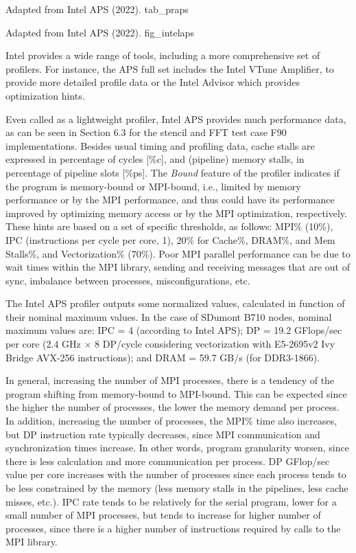     {Adapted from Intel APS (2022).} {tab_praps}

     {Adapted from Intel APS (2022).} {fig_intelaps}

Intel provides a wide range of tools, including a more comprehensive set of profilers. For instance, the APS full set includes the Intel VTune Amplifier, to provide more detailed profile data or the Intel Advisor which provides optimization hints. 

Even called as a lightweight profiler, Intel APS provides much performance data, as can be seen in Section 6.3 for the stencil and FFT test case F90 implementations. Besides usual timing and profiling data, cache stalls are expressed in percentage of cycles [\%c], and (pipeline) memory stalls, in percentage of pipeline slots [\%ps]. The \textit {Bound} feature of the profiler indicates if the program is memory-bound or MPI-bound, i.e., limited by memory performance or by the MPI performance, and thus could have its performance improved by optimizing memory access or by the MPI optimization, respectively. These hints are based on a set of specific thresholds, as follows:  MPI\% (10\%), IPC (instructions per cycle per core, 1), 20\% for Cache\%, DRAM\%, and Mem Stalls\%, and Vectorization\% (70\%). Poor MPI parallel performance can be due to wait times within the MPI library, sending and receiving messages that are out of sync, imbalance between processes, misconfigurations, etc.

The Intel APS profiler outputs some normalized values, calculated in function of their nominal maximum values. In the case of SDumont B710 nodes, nominal maximum values are: IPC = 4 (according to Intel APS); DP = 19.2 GFlops/sec per core (2.4 GHz $\times$ 8 DP/cycle considering vectorization with E5-2695v2 Ivy Bridge AVX-256 instructions); and DRAM = 59.7 GB/s (for DDR3-1866). 

In general, increasing the number of MPI processes, there is a tendency of the program shifting from memory-bound to MPI-bound. This can be expected since the higher the number of processes, the lower the memory demand per process. In addition, increasing the number of processes, the MPI\% time also increases, but DP instruction rate typically decreases, since MPI communication and synchronization times increase. In other words, program granularity worsen, since there is less calculation and more communication per process. DP GFlop/sec value per core increases with the number of processes since each process tends to be less constrained by the memory (less memory stalls in the pipelines, less cache misses, etc.). IPC rate tends to be relatively for the serial program, lower for a small number of MPI processes, but tends to increase for higher number of processes, since there is a higher number of instructions required by calls to the MPI library.

